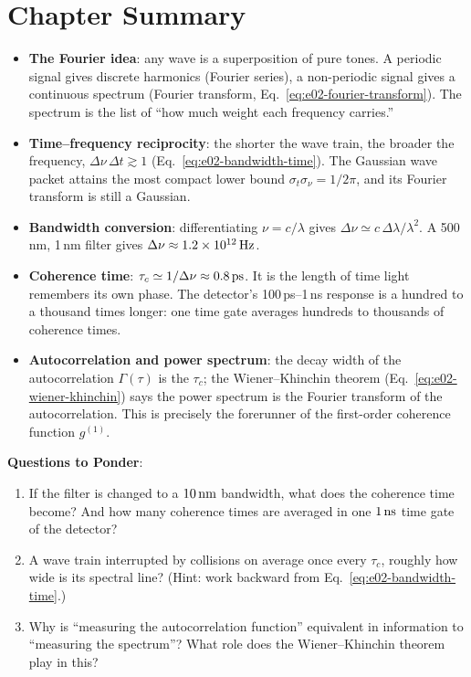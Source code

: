 \section{Chapter Summary}
\label{sec:e02-summary}

\begin{itemize}
  \item \textbf{The Fourier idea}: any wave is a superposition of pure tones. A periodic signal gives discrete harmonics (Fourier series), a non-periodic signal gives a continuous spectrum (Fourier transform, Eq.~\eqref{eq:e02-fourier-transform}). The spectrum is the list of ``how much weight each frequency carries.''
  \item \textbf{Time--frequency reciprocity}: the shorter the wave train, the broader the frequency, \(\Delta\nu\,\Delta t\gtrsim1\) (Eq.~\eqref{eq:e02-bandwidth-time}). The Gaussian wave packet attains the most compact lower bound \(\sigma_t\sigma_\nu=1/2\pi\), and its Fourier transform is still a Gaussian.
  \item \textbf{Bandwidth conversion}: differentiating \(\nu=c/\lambda\) gives \(\Delta\nu\simeq c\,\Delta\lambda/\lambda^{2}\). A 500\,nm, 1\,nm filter gives \(\Delta\nu\approx1.2\times10^{12}\,{\rm Hz}\).
  \item \textbf{Coherence time}: \(\tau_c\simeq1/\Delta\nu\approx0.8\,{\rm ps}\). It is the length of time light remembers its own phase. The detector's 100\,ps--1\,ns response is a hundred to a thousand times longer: one time gate averages hundreds to thousands of coherence times.
  \item \textbf{Autocorrelation and power spectrum}: the decay width of the autocorrelation \(\Gamma(\tau)\) is the \(\tau_c\); the Wiener--Khinchin theorem (Eq.~\eqref{eq:e02-wiener-khinchin}) says the power spectrum is the Fourier transform of the autocorrelation. This is precisely the forerunner of the first-order coherence function \(g^{(1)}\).
\end{itemize}

\noindent\textbf{Questions to Ponder}:
\begin{enumerate}
  \item If the filter is changed to a \(10\,{\rm nm}\) bandwidth, what does the coherence time become? And how many coherence times are averaged in one \(1\,{\rm ns}\) time gate of the detector?
  \item A wave train interrupted by collisions on average once every \(\tau_c\), roughly how wide is its spectral line? (Hint: work backward from Eq.~\eqref{eq:e02-bandwidth-time}.)
  \item Why is ``measuring the autocorrelation function'' equivalent in information to ``measuring the spectrum''? What role does the Wiener--Khinchin theorem play in this?
\end{enumerate}
